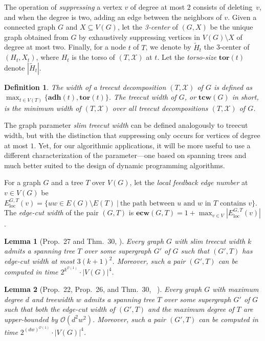 \documentclass[letterpaper]{article} %
\newcommand{\bigoh}{\ensuremath{{\mathcal O}}}
\newtheorem{lemma}{Lemma}
\newtheorem{definition}{Definition}
\newcommand{\adh}{{\mathbf{adh}}}
\newcommand{\tor}{{\mathbf{tor}}}
\newcommand{\tcw}{{\mathbf{tcw}}}
\newcommand{\ecw}{{\mathbf{ecw}}}
\newcommand{\loc}{\operatorname{loc}}
\begin{document}
The operation of {\em suppressing} a vertex $v$ of degree at most $2$ consists of deleting~$v$, and when the degree is two, adding an edge between the neighbors of $v$. Given a connected graph $G$ and  $X\subseteq V(G)$, let the {\em 3-center} of $(G,X)$ be the unique graph obtained from $G$ by exhaustively suppressing vertices in $V(G) \setminus X$ of degree at most two. Finally, for a node $t$ of $T$, we denote by $\tilde{H}_t$ the 3-center of $(H_t,X_t)$, where $H_t$ is the torso of $(T,\mathcal{X})$ at $t$. Let the \emph{torso-size} $\tor(t)$ denote $|\tilde{H}_t|$. 

\begin{definition}
The width of a treecut decomposition $(T,\mathcal{X})$ of $G$ is defined as $\max_{t\in V(T)}\{ \adh(t), \tor(t) \}$. The treecut width of $G$, or $\tcw(G)$ in short, is the minimum width of $(T,\mathcal{X})$ over all treecut decompositions $(T,\mathcal{X})$ of $G$.
\end{definition}

The graph parameter \emph{slim treecut width} can be defined analogously to treecut width, but with the distinction that suppressing only occurs for vertices of degree at most $1$. Yet, for our algorithmic applications, it will be more useful to use a different characterization of the parameter---one based on spanning trees and much better suited to the design of dynamic programming algorithms.

For a graph $G$ and a tree $T$ over $V(G)$, let the \emph{local feedback edge number} at $v\in V(G)$ be $E_{\loc}^{G,T}(v)=\{uw\in E(G)\setminus E(T)~|~\text{the path between $u$ and  $w$ in $T$ contains }v\}.$
The \emph{edge-cut width} of the pair $(G,T)$ is $\ecw(G,T)=1+\max_{v\in V} |E_{\loc}^{G,T}(v)|$.

\begin{lemma}[Prop.\ 27 and Thm.\ 30, \citeauthor{GanianK22} \citeyear{GanianK22}]
\label{lem:computestcw}
Every graph $G$ with slim treecut width $k$ admits a spanning tree $T$ over some supergraph $G'$ of $G$ such that $(G',T)$ has edge-cut width at most $3(k+1)^2$. Moreover, such a pair $(G',T)$ can be computed in time $2^{k^{\bigoh(1)}}\cdot |V(G)|^4$.
\end{lemma}

\begin{lemma}[Prop.\ 22, Prop.\ 26, and Thm.\ 30,~\citeauthor{GanianK22} \citeyear{GanianK22}]
\label{lem:0tcw}
Every graph $G$ with maximum degree $d$ and treewidth $w$ admits a spanning tree $T$ over some supergraph $G'$ of $G$ such that both the edge-cut width of $(G',T)$ and the maximum degree of $T$ are upper-bounded by $\bigoh(d^2w^2)$. Moreover, such a pair $(G',T)$ can be computed in time $2^{(dw)^{\bigoh(1)}}\cdot |V(G)|^4$.
\end{lemma}
\end{document}
